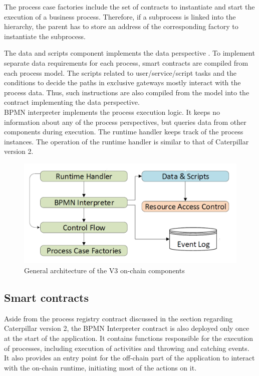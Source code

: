 The process case factories include the set of contracts to instantiate and start the execution of a business process. Therefore, if a subprocess is linked into the hierarchy, the parent has to store an address of the corresponding factory to instantiate the subprocess.

The data and scripts component implements the data perspective \cite{caterpillarv3}. To implement separate data requirements for each process, smart contracts are compiled from each process model. The scripts related to user/service/script tasks and the conditions to decide the paths in exclusive gateways mostly interact with the process data. Thus, such instructions are also compiled from the model into the contract implementing the data perspective.\\

BPMN interpreter implements the process execution logic. It keeps no information about any of the process perspectives, but queries data from other components during execution. The runtime handler keeps track of the process instances. The operation of the runtime handler is similar to that of Caterpillar version 2.

\begin{figure}[hbt]
	\includegraphics[width=\textwidth]{gfx/caterpillar-interpretation-architecture}
	\caption{General architecture of the V3 on-chain components}
	\label{fig:caterpillar:v3:architecture}
\end{figure}

\subsection{Smart contracts}
\label{sec:caterpillar:v3:contracts}

Aside from the process registry contract discussed in the section regarding Caterpillar version 2, the BPMN Interpreter contract is also deployed only once at the start of the application. It contains functions responsible for the execution of processes, including execution of activities and throwing and catching events. It also provides an entry point for the off-chain part of the application to interact with the on-chain runtime, initiating most of the actions on it.

